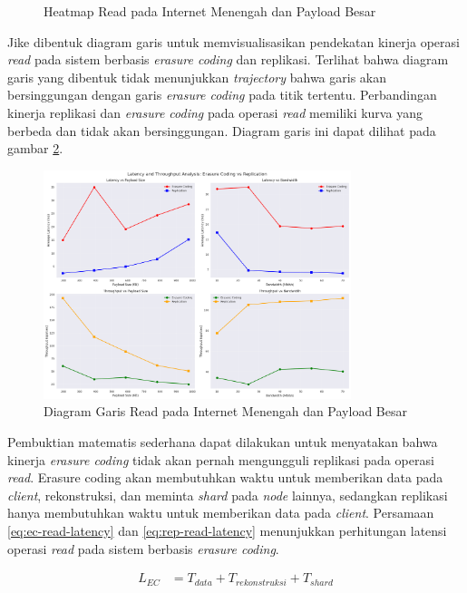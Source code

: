 \begin{enumerate}
\begin{figure}[ht]
    \caption{Heatmap Read pada Internet Menengah dan Payload Besar}
      \label{fig:read-bigload-avgnet-heatmap}
  \end{figure}

  Jike dibentuk diagram garis untuk memvisualisasikan pendekatan kinerja operasi \textit{read} pada sistem berbasis \textit{erasure coding} dan replikasi. Terlihat bahwa diagram garis yang dibentuk tidak menunjukkan \textit{trajectory} bahwa garis akan bersinggungan dengan garis \textit{erasure coding} pada titik tertentu. Perbandingan kinerja replikasi dan \textit{erasure coding} pada operasi \textit{read} memiliki kurva yang berbeda dan tidak akan bersinggungan. Diagram garis ini dapat dilihat pada gambar \ref{fig:read-bigload-avgnet-line}.

  \begin{figure}[ht]
    \centering
    \includegraphics[width=0.8\textwidth]{resources/chapter-4/read_bigload_avgnet_line.png}

    \caption{Diagram Garis Read pada Internet Menengah dan Payload Besar}
    \label{fig:read-bigload-avgnet-line}
  \end{figure}

  Pembuktian matematis sederhana dapat dilakukan untuk menyatakan bahwa kinerja \textit{erasure coding} tidak akan pernah mengungguli replikasi pada operasi \textit{read}. Erasure coding akan membutuhkan waktu untuk memberikan data pada \textit{client}, rekonstruksi, dan meminta \textit{shard} pada \textit{node} lainnya, sedangkan replikasi hanya membutuhkan waktu untuk memberikan data pada \textit{client}. Persamaan \ref{eq:ec-read-latency} dan \ref{eq:rep-read-latency} menunjukkan perhitungan latensi operasi \textit{read} pada sistem berbasis \textit{erasure coding}.

  \begin{align}
  L_{EC} &= T_{data} + T_{rekonstruksi} + T_{shard}
  \label{eq:ec-read-latency}
  \end{align}


\end{enumerate}
